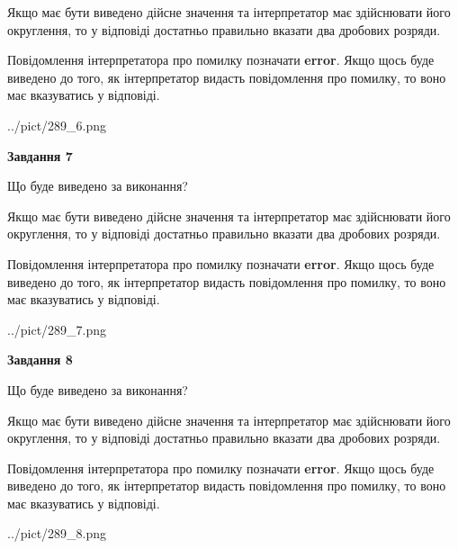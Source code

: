 \documentclass[12pt, ukrainian]{article}
\begin{document}
{\begin {Large}
Якщо має бути виведено дійсне значення та інтерпретатор має здійснювати його округлення, 
то у відповіді достатньо правильно вказати два дробових розряди.

Повідомлення інтерпретатора про помилку позначати \textbf{error}.
Якщо щось буде виведено до того, як інтерпретатор видасть повідомлення про помилку, 
то воно має вказуватись у відповіді. \par

\begin{center}
	{../pict/289_6.png}
\end{center}
\newpage

{\begin {center}\textbf{Завдання 7}\end {center}}\par
Що буде виведено за виконання? \par

Якщо має бути виведено дійсне значення та інтерпретатор має здійснювати його округлення, 
то у відповіді достатньо правильно вказати два дробових розряди.

Повідомлення інтерпретатора про помилку позначати \textbf{error}.
Якщо щось буде виведено до того, як інтерпретатор видасть повідомлення про помилку, 
то воно має вказуватись у відповіді. \par

\begin{center}
	{../pict/289_7.png}
\end{center}
\newpage

{\begin {center}\textbf{Завдання 8}\end {center}}\par
Що буде виведено за виконання? \par

Якщо має бути виведено дійсне значення та інтерпретатор має здійснювати його округлення, 
то у відповіді достатньо правильно вказати два дробових розряди.

Повідомлення інтерпретатора про помилку позначати \textbf{error}.
Якщо щось буде виведено до того, як інтерпретатор видасть повідомлення про помилку, 
то воно має вказуватись у відповіді. \par

\begin{center}
	{../pict/289_8.png}
\end{center}
\newpage


\end{Large}}
\end{document}
